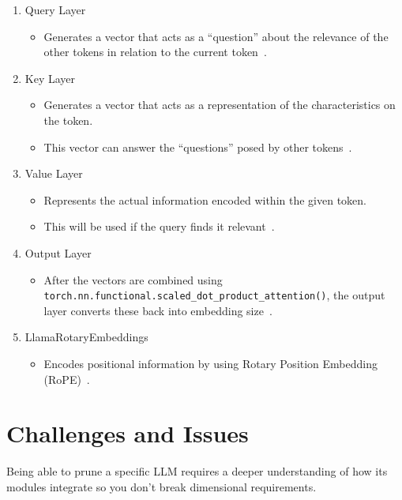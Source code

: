 \documentclass{article}
\begin{document}
    \begin{enumerate}
        \item Query Layer
        \begin{itemize}
            \item Generates a vector that acts as a ``question'' about the relevance of the other tokens in relation to the current token~\cite{bahdanau2016neuralmachinetranslationjointly}.
        \end{itemize}
        \item Key Layer
        \begin{itemize}
            \item Generates a vector that acts as a representation of the characteristics on the token.
            \item This vector can answer the ``questions'' posed by other tokens~\cite{bahdanau2016neuralmachinetranslationjointly}.
        \end{itemize}
        \item Value Layer
        \begin{itemize}
            \item Represents the actual information encoded within the given token.
            \item This will be used if the query finds it relevant~\cite{bahdanau2016neuralmachinetranslationjointly}.
        \end{itemize}
        \item Output Layer
        \begin{itemize}
            \item After the vectors are combined using \texttt{torch.nn.functional.scaled\_dot\_product\_attention()}, the output layer converts these back into embedding size~\cite{huggingface_transformers_llama}.
        \end{itemize}
        \item LlamaRotaryEmbeddings
        \begin{itemize}
            \item Encodes positional information by using Rotary Position Embedding (RoPE)~\cite{su2023roformerenhancedtransformerrotary}.
        \end{itemize}
    \end{enumerate}

    \section{Challenges and Issues}\label{sec:challenges-and-issues}
    Being able to prune a specific LLM requires a deeper understanding of how its modules integrate so you don't break dimensional requirements.
\end{document}
